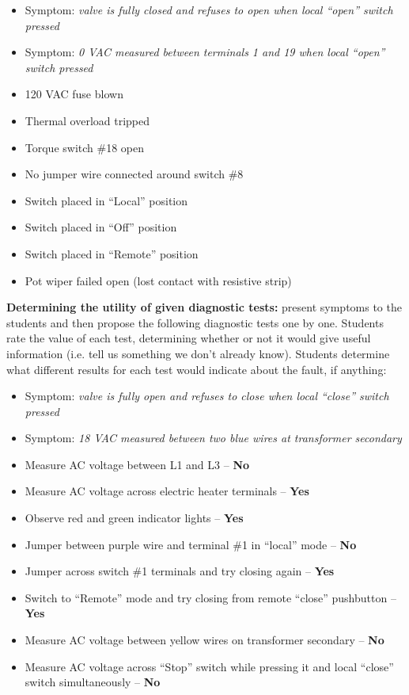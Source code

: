 \begin{itemize}
\item{} Symptom: {\it valve is fully closed and refuses to open when local ``open'' switch pressed}
\item{} Symptom: {\it 0 VAC measured between terminals 1 and 19 when local ``open'' switch pressed}
\item{} 120 VAC fuse blown
\item{} Thermal overload tripped
\item{} Torque switch \#18 open
\item{} No jumper wire connected around switch \#8 
\item{} Switch placed in ``Local'' position
\item{} Switch placed in ``Off'' position
\item{} Switch placed in ``Remote'' position
\item{} Pot wiper failed open (lost contact with resistive strip)
\end{itemize}


\vskip 10pt


\noindent
{\bf Determining the utility of given diagnostic tests:} present symptoms to the students and then propose the following diagnostic tests one by one.  Students rate the value of each test, determining whether or not it would give useful information (i.e. tell us something we don't already know).  Students determine what different results for each test would indicate about the fault, if anything:

\begin{itemize}
\item{} Symptom: {\it valve is fully open and refuses to close when local ``close'' switch pressed}
\item{} Symptom: {\it 18 VAC measured between two blue wires at transformer secondary}
\item{} Measure AC voltage between L1 and L3 -- {\bf No}
\item{} Measure AC voltage across electric heater terminals  -- {\bf Yes}
\item{} Observe red and green indicator lights -- {\bf Yes}
\item{} Jumper between purple wire and terminal \#1 in ``local'' mode -- {\bf No}
\item{} Jumper across switch \#1 terminals and try closing again -- {\bf Yes}
\item{} Switch to ``Remote'' mode and try closing from remote ``close'' pushbutton -- {\bf Yes}
\item{} Measure AC voltage between yellow wires on transformer secondary -- {\bf No}
\item{} Measure AC voltage across ``Stop'' switch while pressing it and local ``close'' switch simultaneously -- {\bf No}
\end{itemize}



